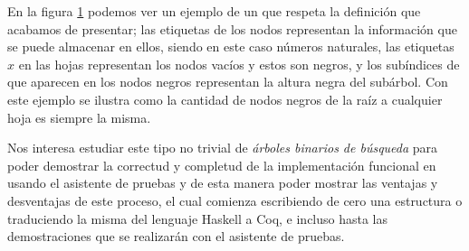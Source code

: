 \begin{figure}[!ht]
\centering
\captionsetup{justification=centering}
\caption {\Arn}
\label{arbolRB_1}
\end{figure}

En la figura \ref{arbolRB_1} podemos ver un ejemplo de un {\arn} que respeta la definici\'on que
acabamos de presentar; las etiquetas de los nodos representan la informaci\'on que se puede almacenar en ellos, siendo en este caso n\'umeros naturales, las etiquetas $x$ en las hojas representan los nodos vacíos y estos
son negros, y los subíndices de que aparecen en los nodos negros representan la altura negra del sub\'arbol.
Con este ejemplo se ilustra como la cantidad de nodos negros de la ra\'iz a cualquier hoja es
siempre la misma.

Nos interesa estudiar este tipo no trivial de \textit{\'arboles binarios de búsqueda} para poder
demostrar la correctud y completud de la implementaci\'on funcional en \cite{tesisG} 
usando el asistente de pruebas {\coq} y de esta
manera poder mostrar las ventajas y desventajas de este proceso, el cual comienza escribiendo de
cero una estructura o traduciendo la misma del lenguaje Haskell a Coq, e incluso hasta las
demostraciones que se realizar\'an con el asistente de pruebas.

